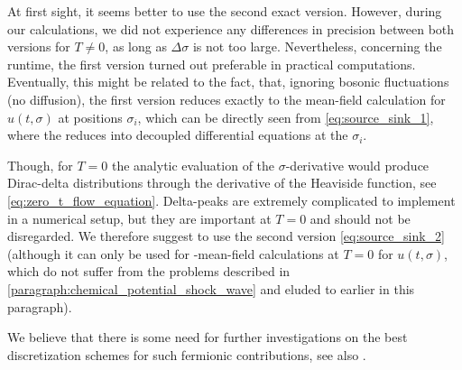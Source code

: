 At first sight, it seems better to use the second exact version.
However, during our calculations, we did not experience any differences in precision between both versions for $T \neq 0$, as long as $\Delta \sigma$ is not too large.
Nevertheless, concerning the runtime, the first version turned out preferable in practical computations.
Eventually, this might be related to the fact, that, ignoring bosonic fluctuations (no diffusion), the first version reduces exactly to the mean-field calculation for $u ( t, \sigma )$ at positions $\sigma_i$, which can be directly seen from \cref{eq:source_sink_1}, where the \pde{} reduces into decoupled differential equations at the $\sigma_i$.

Though, for $T = 0$ the analytic evaluation of the $\sigma$-derivative would produce Dirac-delta distributions through the derivative of the Heaviside function, see \cref{eq:zero_t_flow_equation}. Delta-peaks are extremely complicated to implement in a numerical setup, but they are important at $T=0$ and should not be disregarded.
We therefore suggest to use the second version \eqref{eq:source_sink_2} (although it can only be used for \frg{}-mean-field calculations at $T=0$ for $u ( t, \sigma )$, which do not suffer from the problems described in \cref{paragraph:chemical_potential_shock_wave} and eluded to earlier in this paragraph).
	
We believe that there is some need for further investigations on the best discretization schemes for such fermionic contributions, see also .
